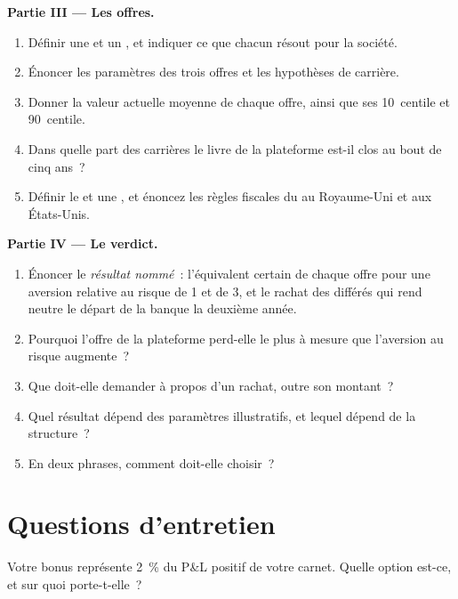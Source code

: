 \begin{problem}
\medskip\noindent\textbf{Partie III --- Les offres.}
\begin{enumerate}[resume]
\item Définir une  et un , et indiquer ce que chacun résout pour la société.
\item Énoncer les paramètres des trois offres et les hypothèses de carrière.
\item Donner la valeur actuelle moyenne de chaque offre, ainsi que ses 10~centile et 90~centile.
\item Dans quelle part des carrières le livre de la plateforme est-il clos au bout de cinq ans~?
\item Définir le  et une , et énoncez les règles fiscales du  au Royaume-Uni et aux États-Unis.
\end{enumerate}

\medskip\noindent\textbf{Partie IV --- Le verdict.}
\begin{enumerate}[resume]
\item Énoncer le \emph{résultat nommé}~: l'équivalent certain de chaque offre pour une aversion relative au risque de 1 et de 3, et le
rachat des différés qui rend neutre le départ de la banque la deuxième année.
\item Pourquoi l'offre de la plateforme perd-elle le plus à mesure que l'aversion au risque augmente~?
\item Que doit-elle demander à propos d'un rachat, outre son montant~?
\item Quel résultat dépend des paramètres illustratifs, et lequel dépend de la structure~?
\item En deux phrases, comment doit-elle choisir~?
\end{enumerate}
\end{problem}

\section{Questions d'entretien}

\begin{interviewq}\label{iq:in:how-pay-works:1}
Votre bonus représente 2~\% du P\&L positif de votre carnet. Quelle option est-ce, et sur quoi porte-t-elle~?
\end{interviewq}

